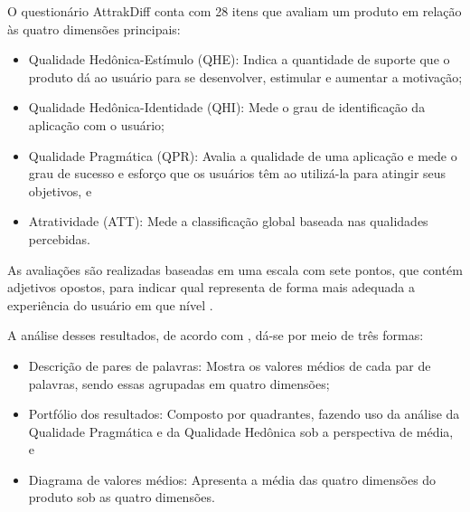 \begin{description}
\item O questionário AttrakDiff conta com 28 itens que avaliam um produto em relação às quatro dimensões principais:
      \begin{itemize}
          \item Qualidade Hedônica-Estímulo (QHE): Indica a quantidade de suporte que o produto dá ao usuário para se 
          desenvolver, estimular e aumentar a motivação;

          \item Qualidade Hedônica-Identidade (QHI): Mede o grau de identificação da aplicação com o usuário;

          \item Qualidade Pragmática (QPR): Avalia a qualidade de uma aplicação e mede o grau de sucesso e esforço que 
          os usuários têm ao utilizá-la para atingir seus objetivos, e

          \item Atratividade (ATT): Mede a classificação global baseada nas qualidades percebidas.
      \end{itemize}
\end{description}

As avaliações são realizadas baseadas em uma escala com sete pontos, que contém adjetivos opostos, para indicar qual 
representa de forma mais adequada a experiência do usuário em que nível \cite{natashatayana2015} \cite{hassenzahl2003}.

\begin{description}
    \item A análise desses resultados, de acordo com , dá-se por meio de três formas: 
          \begin{itemize}
              \item Descrição de pares de palavras: Mostra os valores médios de cada par de palavras, sendo essas agrupadas em quatro dimensões;
    
              \item Portfólio dos resultados: Composto por quadrantes, fazendo uso da análise da Qualidade Pragmática e da Qualidade 
              Hedônica sob a perspectiva de média, e
    
              \item Diagrama de valores médios: Apresenta a média das quatro dimensões do produto sob as quatro dimensões.
          \end{itemize}
\end{description}

